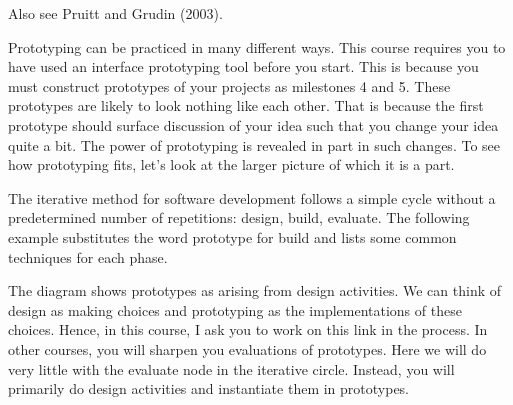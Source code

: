 Also see Pruitt and Grudin (2003).

\hypertarget{prototyping}{%
\label{prototyping}}

Prototyping can be practiced in many different ways. This course
requires you to have used an interface prototyping tool before you
start. This is because you must construct prototypes of your projects as
milestones 4 and 5. These prototypes are likely to look nothing like
each other. That is because the first prototype should surface
discussion of your idea such that you change your idea quite a bit. The
power of prototyping is revealed in part in such changes. To see how
prototyping fits, let's look at the larger picture of which it is a
part.

\hypertarget{iterative-development}{%
\label{iterative-development}}

The iterative method for software development follows a simple cycle
without a predetermined number of repetitions: design, build, evaluate.
The following example substitutes the word prototype for build and lists
some common techniques for each phase.

\hypertarget{iterative-model-diagram}{%
\label{iterative-model-diagram}}

The diagram shows prototypes as arising from design activities. We can
think of design as making choices and prototyping as the implementations
of these choices. Hence, in this course, I ask you to work on this link
in the process. In other courses, you will sharpen you evaluations of
prototypes. Here we will do very little with the evaluate node in the
iterative circle. Instead, you will primarily do design activities and
instantiate them in prototypes.

